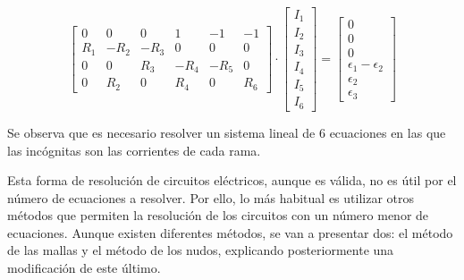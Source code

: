 \begin{example}
\begin{enumerate}
\begin{equation*}
\begin{bmatrix}
                0 & 0 & 0 & 1 & -1 & -1\\
                R_1 & -R_2 & - R_3 & 0 & 0 & 0\\
                0 & 0 & R_3 & - R_4 & - R_5 & 0\\
                0 & R_2 & 0 & R_4 & 0 & R_6
              \end{bmatrix} \cdot %
              \begin{bmatrix}
                I_1\\
                I_2\\
                I_3\\
                I_4\\
                I_5\\
                I_6    
              \end{bmatrix} = %
              \begin{bmatrix}
                0\\
                0\\
                0\\
                \epsilon_1 - \epsilon_2\\
                \epsilon_2\\
                \epsilon_3
              \end{bmatrix}
            \end{equation*}
          \end{enumerate}
          Se observa que es necesario resolver un sistema lineal de 6
          ecuaciones en las que las incógnitas son las corrientes de
          cada rama.
	\end{example}
	
	Esta forma de resolución de circuitos eléctricos, aunque es
        válida, no es útil por el número de ecuaciones a resolver. Por
        ello, lo más habitual es utilizar otros métodos que permiten
        la resolución de los circuitos con un número menor de
        ecuaciones. Aunque existen diferentes métodos, se van a
        presentar dos: el método de las mallas y el método de los
        nudos, explicando posteriormente una modificación de este
        último.
	
